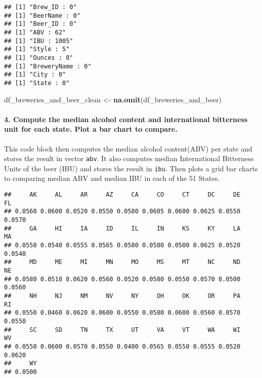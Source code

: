 \documentclass[]{article}
\newenvironment{Shaded}{\begin{snugshade}}{\end{snugshade}}
\newcommand{\CommentTok}[1]{\textcolor[rgb]{0.56,0.35,0.01}{\textit{#1}}}
\newcommand{\DataTypeTok}[1]{\textcolor[rgb]{0.13,0.29,0.53}{#1}}
\newcommand{\KeywordTok}[1]{\textcolor[rgb]{0.13,0.29,0.53}{\textbf{#1}}}
\newcommand{\NormalTok}[1]{#1}
\newcommand{\OperatorTok}[1]{\textcolor[rgb]{0.81,0.36,0.00}{\textbf{#1}}}
\newcommand{\OtherTok}[1]{\textcolor[rgb]{0.56,0.35,0.01}{#1}}
\newcommand{\StringTok}[1]{\textcolor[rgb]{0.31,0.60,0.02}{#1}}
\let\oldparagraph\paragraph
\renewcommand{\paragraph}[1]{\oldparagraph{#1}\mbox{}}
\begin{document}
\begin{verbatim}
## [1] "Brew_ID : 0"
## [1] "BeerName : 0"
## [1] "Beer_ID : 0"
## [1] "ABV : 62"
## [1] "IBU : 1005"
## [1] "Style : 5"
## [1] "Ounces : 0"
## [1] "BreweryName : 0"
## [1] "City : 0"
## [1] "State : 0"
\end{verbatim}

\begin{Shaded}
\begin{Highlighting}[]
\NormalTok{df_breweries_and_beer_clean <-}\StringTok{ }\KeywordTok{na.omit}\NormalTok{(df_breweries_and_beer)}
\end{Highlighting}
\end{Shaded}

\hypertarget{compute-the-median-alcohol-content-and-international-bitterness-unit-for-each-state.-plot-a-bar-chart-to-compare.}{%
\paragraph{4. Compute the median alcohol content and international
bitterness unit for each state. Plot a bar chart to
compare.}\label{compute-the-median-alcohol-content-and-international-bitterness-unit-for-each-state.-plot-a-bar-chart-to-compare.}}

This code block then computes the median alcohol content(ABV) per state
and stores the result in vector \texttt{abv}. It also computes median
International Bitterness Units of the beer (IBU) and stores the result
in \texttt{ibu}. Then plots a grid bar charts to comparing median ABV
and median IBU in each of the 51 States.

\begin{Shaded}
\end{Shaded}

\begin{verbatim}
##     AK     AL     AR     AZ     CA     CO     CT     DC     DE     FL 
## 0.0560 0.0600 0.0520 0.0550 0.0580 0.0605 0.0600 0.0625 0.0550 0.0570 
##     GA     HI     IA     ID     IL     IN     KS     KY     LA     MA 
## 0.0550 0.0540 0.0555 0.0565 0.0580 0.0580 0.0500 0.0625 0.0520 0.0540 
##     MD     ME     MI     MN     MO     MS     MT     NC     ND     NE 
## 0.0580 0.0510 0.0620 0.0560 0.0520 0.0580 0.0550 0.0570 0.0500 0.0560 
##     NH     NJ     NM     NV     NY     OH     OK     OR     PA     RI 
## 0.0550 0.0460 0.0620 0.0600 0.0550 0.0580 0.0600 0.0560 0.0570 0.0550 
##     SC     SD     TN     TX     UT     VA     VT     WA     WI     WV 
## 0.0550 0.0600 0.0570 0.0550 0.0400 0.0565 0.0550 0.0555 0.0520 0.0620 
##     WY 
## 0.0500
\end{verbatim}
\end{document}
